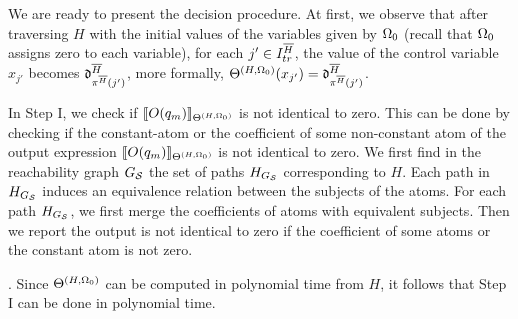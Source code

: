 We are ready to present the decision procedure. At first, we observe that  after traversing $H$ with the initial values of the variables given by $\Omega_0$ (recall that $\Omega_0$ assigns zero to each variable), for each $j' \in I^{\overline{H}}_{tr}$, the value of the control variable $x_{j'}$ becomes $\mathfrak{d}^{\overline{H}}_{\pi^{\overline{H}}(j')}$,  more formally, $\Theta^{(H,\Omega_0)}(x_{j'})=\mathfrak{d}^{\overline{H}}_{\pi^{\overline{H}}(j')}$.

In Step I, we check if $\llbracket O(q_m)\rrbracket_{\Theta^{(H,\Omega_0)}}$ is not identical to zero.
This can be done by checking if the constant-atom or the coefficient of some non-constant atom of the output expression $\llbracket O(q_m)\rrbracket_{\Theta^{(H,\Omega_0)}}$ is not identical to zero.
We first find in the reachability graph $G_{{\mathcal{S} }}$ the set of paths $H_{G_{{\mathcal{S} }}}$ corresponding to $H$. Each path in $H_{G_{{\mathcal{S} }}}$ induces an equivalence relation between the subjects of the atoms. 
For each path $H_{G_{{\mathcal{S} }}}$, we first merge the coefficients of atoms with equivalent subjects. Then we report the output is not identical to zero if the coefficient of some atoms or the constant atom is not zero.
\smallskip\\
\bigskip

. Since $\Theta^{(H,\Omega_0)}$ can be computed in polynomial time from $H$, it follows that Step I can be done in polynomial time.

\smallskip

